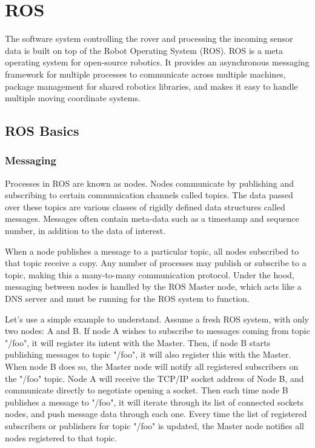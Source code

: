 \chapter{ROS}

The software system controlling the rover and processing the incoming sensor data is built on top of the Robot Operating System (ROS). ROS is a meta operating system for open-source robotics. It provides an asynchronous messaging framework for multiple processes to communicate across multiple machines, package management for shared robotics libraries, and makes it easy to handle multiple moving coordinate systems.

\section{ROS Basics}

\subsection{Messaging}

Processes in ROS are known as nodes. Nodes communicate by publishing and subscribing to certain communication channels called topics. The data passed over these topics are various classes of rigidly defined data structures called messages. Messages often contain meta-data such as a timestamp and sequence number, in addition to the data of interest.

When a node publishes a message to a particular topic, all nodes subscribed to that topic receive a copy. Any number of processes may publish or subscribe to a topic, making this a many-to-many communication protocol. Under the hood, messaging between nodes is handled by the ROS Master node, which acts like a DNS server and must be running for the ROS system to function. 

Let's use a simple example to understand. Assume a fresh ROS system, with only two nodes: A and B. If node A wishes to subscribe to messages coming from topic "/foo", it will register its intent with the Master. Then, if node B starts publishing messages to topic "/foo", it will also register this with the Master. When node B does so, the Master node will notify all registered subscribers on the "/foo" topic. Node A will receive the TCP/IP socket address of Node B, and communicate directly to negotiate opening a socket. Then each time node B publishes a message to "/foo", it will iterate through its list of connected sockets nodes, and push message data through each one. Every time the list of registered subscribers or publishers for topic "/foo" is updated, the Master node notifies all nodes registered to that topic.

